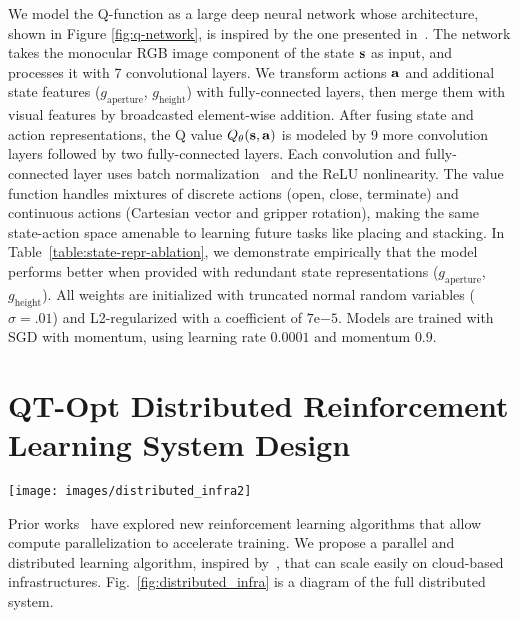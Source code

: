 \documentclass{article}
\begin{document}
We model the Q-function as a large deep neural network whose architecture, shown in Figure \ref{fig:q-network}, is inspired by the one presented in~\cite{levine16}. The network takes the monocular RGB image component of the state $\mathbf{s}$ as input, and processes it with 7 convolutional layers. We transform actions $\mathbf{a}$ and additional state features ($g_\text{aperture}$, $g_\text{height}$) with fully-connected layers, then merge them with visual features by broadcasted element-wise addition. After fusing state and action representations, the Q value $Q_\theta(\mathbf{s}, \mathbf{a})$ is modeled by 9 more convolution layers followed by two fully-connected layers. Each convolution and fully-connected layer uses batch normalization~\cite{is-bnad-15} and the ReLU nonlinearity. The value function handles mixtures of discrete actions (open, close, terminate) and continuous actions (Cartesian vector and gripper rotation), making the same state-action space amenable to learning future tasks like placing and stacking. In Table~\ref{table:state-repr-ablation}, we demonstrate empirically that the model performs better when provided with redundant state representations ($g_\text{aperture}$, $g_\text{height}$). All weights are initialized with truncated normal random variables ($\sigma=.01$) and L2-regularized with a coefficient of $7\mathrm{e}{-5}$. Models are trained with SGD with momentum, using learning rate $0.0001$ and momentum $0.9$.


\section{QT-Opt Distributed Reinforcement Learning System Design}
\label{sec:appendix_distributed_rl_infra}
\begin{figure*}
\begin{center}
 \texttt{[image: images/distributed\_infra2]}
\end{center}
   \caption{Architecture of the QT-Opt distributed reinforcement learning algorithm.}
\label{fig:distributed_infra}
\vspace{-0.2in}
\end{figure*}

Prior works~\citep{stooke_accelerated,impala} have explored new reinforcement learning algorithms that allow compute parallelization to accelerate training. We propose a parallel and distributed learning algorithm, inspired by~\citep{gorila}, that can scale easily on cloud-based infrastructures. Fig.~\ref{fig:distributed_infra} is a diagram of the full distributed system.
\end{document}
